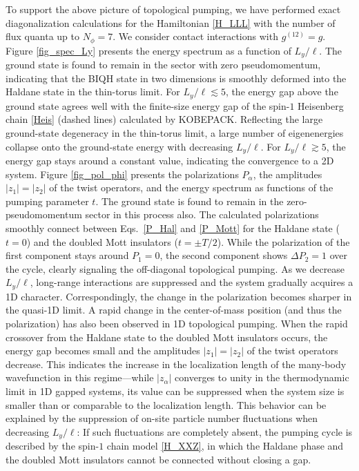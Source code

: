 \documentclass[aps,prb,twocolumn,superscriptaddress,showpacs,floatfix]{revtex4-1}
\begin{document}
To support the above picture of topological pumping, we have performed exact diagonalization calculations for the Hamiltonian \eqref{H_LLL} with the number of flux quanta up to $N_\phi=7$. 
We consider contact interactions with $g^{(12)}=g$. Figure \ref{fig_spec_Ly} presents the energy spectrum as a function of $L_y/\ell$. 
The ground state is found to remain in the sector with zero pseudomomentum, indicating that the BIQH state in two dimensions is smoothly deformed into the Haldane state in the thin-torus limit. 
For $L_y/\ell\lesssim 5$, the energy gap above the ground state agrees well with the finite-size energy gap of the spin-$1$ Heisenberg chain \eqref{Heis} (dashed lines) calculated by KOBEPACK.\cite{KOBEPACK,Kaburagi} 
Reflecting the large ground-state degeneracy in the thin-torus limit, a large number of eigenenergies collapse onto the ground-state energy with decreasing $L_y/\ell$. 
For $L_y/\ell\gtrsim 5$, the energy gap stays around a constant value, indicating the convergence to a 2D system. Figure \ref{fig_pol_phi} presents the polarizations $P_\alpha$, the amplitudes $|z_1|=|z_2|$ of the twist operators, and the energy spectrum as functions of the pumping parameter $t$. 
The ground state is found to remain in the zero-pseudomomentum sector in this process also. 
The calculated polarizations smoothly connect between Eqs.\ \eqref{P_Hal} and \eqref{P_Mott} for the Haldane state ($t=0$) and the doubled Mott insulators ($t=\pm T/2$). 
While the polarization of the first component stays around $P_1=0$, the second component shows $\Delta P_2=1$ over the cycle, clearly signaling the off-diagonal topological pumping. 
As we decrease $L_y/\ell$, long-range interactions are suppressed and the system gradually acquires a 1D character. 
Correspondingly, the change in the polarization becomes sharper in the quasi-1D limit. A rapid change in the center-of-mass position (and thus the polarization) has also been observed in 1D topological pumping.\cite{Nakajima, Lohse, WangTroyerDai, WeiMueller} 
When the rapid crossover from the Haldane state to the doubled Mott insulators occurs, the energy gap becomes small and the amplitudes $|z_1|=|z_2|$ of the twist operators decrease. 
This indicates the increase in the localization length of the many-body wavefunction in this regime---while $|z_\alpha|$ converges to unity in the thermodynamic limit in 1D gapped systems, its value can be suppressed when the system size is smaller than or comparable to the localization length.\cite{RestaSorella,NakamuraVoit,NakamuraTodo} 
This behavior can be explained by the suppression of on-site particle number fluctuations when decreasing $L_y/\ell$:  
If such fluctuations are completely absent, the pumping cycle is described by the spin-$1$ chain model \eqref{H_XXZ}, in which the Haldane phase and the doubled Mott insulators cannot be connected without closing a gap. 
\end{document}
